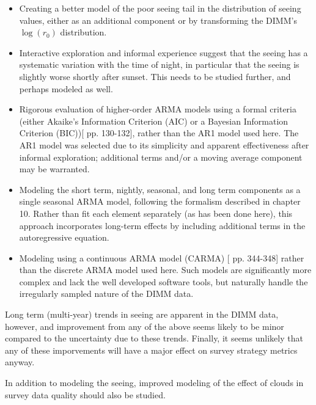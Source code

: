 \documentclass[DM,authoryear,toc]{lsstdoc}
\begin{document}
\begin{itemize}

\item Creating a better model of the poor seeing tail in the
  distribution of seeing values, either as an additional component or
  by transforming the DIMM's $\log(r_0)$ distribution.

\item Interactive exploration and informal experience suggest that the
  seeing has a systematic variation with the time of night, in
  particular that the seeing is slightly worse shortly after
  sunset. This needs to be studied further, and perhaps modeled as
  well.

\item Rigorous evaluation of higher-order ARMA models using a formal
  criteria (either Akaike's Information Criterion (AIC) or a Bayesian
  Information Criterion (BIC))[\cite{cryer_time_2008} pp. 130-132],
  rather than the AR1 model used here. The AR1 model was selected due
  to its simplicity and apparent effectiveness after informal
  exploration; additional terms and/or a moving average component may
  be warranted.

\item Modeling the short term, nightly, seasonal, and long term
  components as a single seasonal ARMA model, following the formalism
  described in \cite{cryer_time_2008} chapter 10. Rather than fit each
  element separately (as has been done here), this approach
  incorporates long-term effects by including additional terms in the
  autoregressive equation.
  
\item Modeling using a continuous ARMA model (CARMA)
  [\cite{brockwell_introduction_1996} pp. 344-348] rather than the
  discrete ARMA model used here. Such models are significantly more
  complex and lack the well developed software tools, but naturally
  handle the irregularly sampled nature of the DIMM data.
  
\end{itemize}

Long term (multi-year) trends in seeing are apparent in the DIMM data,
however, and improvement from any of the above seems likely to be
minor compared to the uncertainty due to these trends. Finally, it
seems unlikely that any of these imporvements will have a major effect
on survey strategy metrics anyway.

In addition to modeling the seeing, improved modeling of the effect of
clouds in survey data quality should also be studied.
\end{document}
